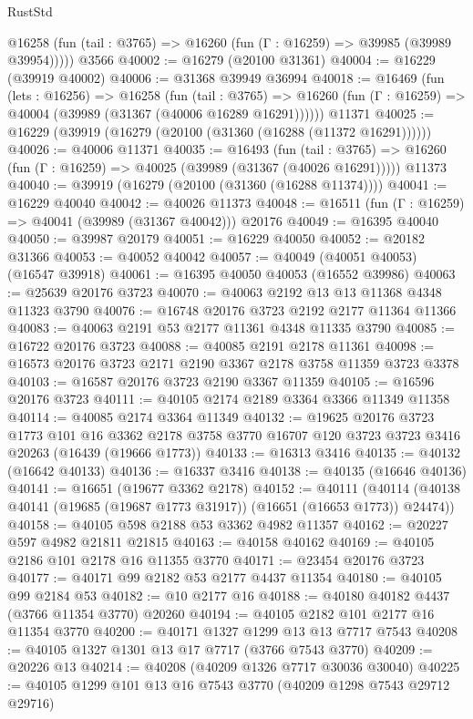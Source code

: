 \begin{lexlean}{RustStd}
\begin{coremodule}
      @16258 (fun (tail : @3765) => @16260 (fun (Γ : @16259) => @39985 (@39989 @39954)))))
    @3566
@40002 := @16279 (@20100 @31361)
@40004 := @16229 (@39919 @40002)
@40006 := @31368 @39949 @36994
@40018 := @16469
    (fun (lets : @16256) =>
    @16258
      (fun (tail : @3765) =>
      @16260 (fun (Γ : @16259) => @40004 (@39989 (@31367 (@40006 @16289 @16291))))))
    @11371
@40025 := @16229 (@39919 (@16279 (@20100 (@31360 (@16288 (@11372 @16291))))))
@40026 := @40006 @11371
@40035 := @16493
    (fun (tail : @3765) => @16260 (fun (Γ : @16259) => @40025 (@39989 (@31367 (@40026 @16291)))))
    @11373
@40040 := @39919 (@16279 (@20100 (@31360 (@16288 @11374))))
@40041 := @16229 @40040
@40042 := @40026 @11373
@40048 := @16511 (fun (Γ : @16259) => @40041 (@39989 (@31367 @40042))) @20176
@40049 := @16395 @40040
@40050 := @39987 @20179
@40051 := @16229 @40050
@40052 := @20182 @31366
@40053 := @40052 @40042
@40057 := @40049 (@40051 @40053) (@16547 @39918)
@40061 := @16395 @40050 @40053 (@16552 @39986)
@40063 := @25639 @20176 @3723
@40070 := @40063 @2192 @13 @13 @11368 @4348 @11323 @3790
@40076 := @16748 @20176 @3723 @2192 @2177 @11364 @11366
@40083 := @40063 @2191 @53 @2177 @11361 @4348 @11335 @3790
@40085 := @16722 @20176 @3723
@40088 := @40085 @2191 @2178 @11361
@40098 := @16573 @20176 @3723 @2171 @2190 @3367 @2178 @3758 @11359 @3723 @3378
@40103 := @16587 @20176 @3723 @2190 @3367 @11359
@40105 := @16596 @20176 @3723
@40111 := @40105 @2174 @2189 @3364 @3366 @11349 @11358
@40114 := @40085 @2174 @3364 @11349
@40132 := @19625
    @20176
    @3723
    @1773
    @101
    @16
    @3362
    @2178
    @3758
    @3770
    @16707
    @120
    @3723
    @3723
    @3416
    @20263
    (@16439 (@19666 @1773))
@40133 := @16313 @3416
@40135 := @40132 (@16642 @40133)
@40136 := @16337 @3416
@40138 := @40135 (@16646 @40136)
@40141 := @16651 (@19677 @3362 @2178)
@40152 := @40111
    (@40114 (@40138 @40141 (@19685 (@19687 @1773 @31917)) (@16651 (@16653 @1773)) @24474))
@40158 := @40105 @598 @2188 @53 @3362 @4982 @11357
@40162 := @20227 @597 @4982 @21811 @21815
@40163 := @40158 @40162
@40169 := @40105 @2186 @101 @2178 @16 @11355 @3770
@40171 := @23454 @20176 @3723
@40177 := @40171 @99 @2182 @53 @2177 @4437 @11354
@40180 := @40105 @99 @2184 @53
@40182 := @10 @2177 @16
@40188 := @40180 @40182 @4437 (@3766 @11354 @3770) @20260
@40194 := @40105 @2182 @101 @2177 @16 @11354 @3770
@40200 := @40171 @1327 @1299 @13 @13 @7717 @7543
@40208 := @40105 @1327 @1301 @13 @17 @7717 (@3766 @7543 @3770)
@40209 := @20226 @13
@40214 := @40208 (@40209 @1326 @7717 @30036 @30040)
@40225 := @40105 @1299 @101 @13 @16 @7543 @3770 (@40209 @1298 @7543 @29712 @29716)

\end{coremodule}
\end{lexlean}
